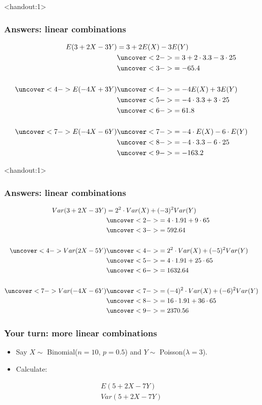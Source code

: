 \documentclass[handout]{beamer}\usepackage{graphicx, color}
\newcommand{\answers}{1}
\numberwithin{equation}{section}
\begin{document}
\begin{frame}<handout:\answers>
\frametitle{Answers: linear combinations}
\begin{align*}
E(3 + 2X - 3Y) &= 3 + 2 E(X) - 3 E(Y) \\
& \uncover<2->{= 3 + 2 \cdot 3.3 - 3 \cdot 25} \\
& \uncover<3->{= -65.4} \\ \\
\uncover<4->{E(-4 X + 3Y)} & \uncover<4->{= -4 E(X) + 3 E(Y)} \\
&\uncover<5->{ = -4 \cdot 3.3 + 3 \cdot 25} \\
&\uncover<6->{ = 61.8} \\ \\
\uncover<7->{E(-4X - 6Y)} & \uncover<7->{ = -4 \cdot E(X) - 6 \cdot E(Y)} \\
& \uncover<8->{= -4 \cdot 3.3 - 6 \cdot 25} \\
& \uncover<9->{= -163.2}
\end{align*}
\end{frame}

\begin{frame}<handout:\answers>
\frametitle{Answers: linear combinations}
\begin{align*}
Var(3 + 2X - 3Y) &= 2^2 \cdot Var(X) + (-3)^2 Var(Y) \\ 
&\uncover<2->{ = 4 \cdot 1.91 + 9 \cdot 65} \\
& \uncover<3->{= 592.64} \\ \\
\uncover<4->{Var(2X - 5Y)} & \uncover<4->{= 2^2 \cdot Var(X) + (-5)^2 Var(Y)} \\
& \uncover<5->{= 4 \cdot 1.91 + 25 \cdot 65} \\
& \uncover<6->{= 1632.64} \\ \\
\uncover<7->{Var(-4X - 6Y)} & \uncover<7->{= (-4)^2 \cdot Var(X) + (-6)^2 Var(Y)} \\
& \uncover<8->{= 16 \cdot 1.91 + 36 \cdot 65} \\
&\uncover<9->{ = 2370.56}
\end{align*} 
\end{frame}


\begin{frame}
\frametitle{Your turn: more linear combinations}
\begin{itemize}
\item Say $X \sim$ Binomial($n= 10$, $p = 0.5$) and $Y \sim$ Poisson($\lambda = 3$).
\item Calculate:
\end{itemize}
\begin{align*}
E(5 + 2X - 7 Y) \\
Var(5 + 2X - 7 Y)
\end{align*}
\end{frame}
\end{document}

